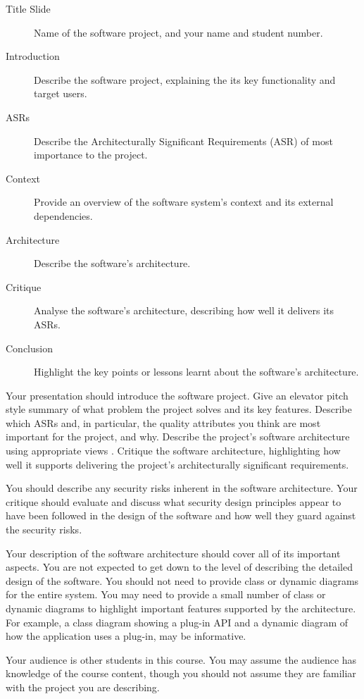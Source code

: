 \documentclass{csse4400}
\begin{document}
\begin{description}
    \item[Title Slide] Name of the software project, and your name and student number.
    \item[Introduction] Describe the software project, explaining the its key functionality and target users.
    \item[ASRs] Describe the Architecturally Significant Requirements (ASR) of most importance to the project.
    \item[Context] Provide an overview of the software system's context and its external dependencies.
    \item[Architecture] Describe the software's architecture.
    \item[Critique] Analyse the software's architecture, describing how well it delivers its ASRs.
    \item[Conclusion] Highlight the key points or lessons learnt about the software's architecture.
\end{description}

Your presentation should introduce the software project.
Give an elevator pitch style summary of what problem the project solves and its key features.
Describe which ASRs and, in particular, the quality attributes you think are most important for the project, and why.
Describe the project's software architecture using appropriate views \cite{view-notes}.
Critique the software architecture, highlighting how well it supports delivering the project's architecturally significant requirements.

You should describe any security risks inherent in the software architecture.
Your critique should evaluate and discuss what security design principles appear to have been followed in the design of the software and how well they guard against the security risks.

Your description of the software architecture should cover all of its important aspects.
You are not expected to get down to the level of describing the detailed design of the software.
You should not need to provide class or dynamic diagrams for the entire system.
You may need to provide a small number of class or dynamic diagrams to highlight important features supported by the architecture.
For example, a class diagram showing a plug-in API and a dynamic diagram of how the application uses a plug-in, may be informative.

Your audience is other students in this course. You may assume the audience has knowledge of the course content,
though you should not assume they are familiar with the project you are describing.
\end{document}
